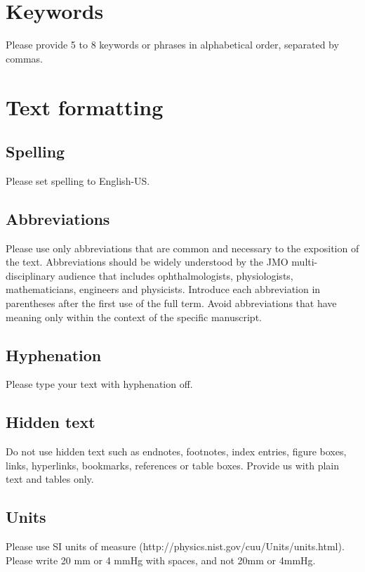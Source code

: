 \documentclass{jmoarticle}
\begin{document}
\section{Keywords}
Please provide 5 to 8 keywords or phrases in alphabetical order, separated by
commas.

\section{Text formatting}

\subsection{Spelling}
Please set spelling to English-US.

\subsection{Abbreviations}
Please use only abbreviations that are common and necessary to the exposition
of the text. Abbreviations should be widely understood by the JMO
multi-disciplinary audience that includes ophthalmologists, physiologists,
mathematicians, engineers and physicists. Introduce each abbreviation in
parentheses after the first use of the full term. Avoid abbreviations that have
meaning only within the context of the specific manuscript.

\subsection{Hyphenation}
Please type your text with hyphenation off.

\subsection{Hidden text}
Do not use hidden text such as endnotes, footnotes, index entries, figure
boxes, links, hyperlinks, bookmarks, references or table boxes. Provide us with
plain text and tables only.

\subsection{Units}
Please use SI units of measure (http://physics.nist.gov/cuu/Units/units.html).
Please write 20 mm or 4 mmHg with spaces, and not 20mm or 4mmHg.
\end{document}
